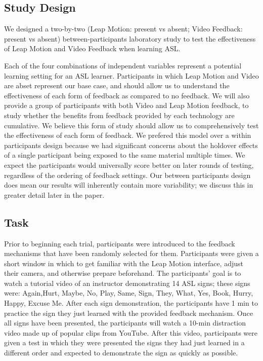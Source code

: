 \documentclass{sigchi}
\begin{document}
\subsection{Study Design}
We designed a two-by-two (Leap Motion: present vs absent; Video Feedback: present vs absent) between-participants laboratory study to test the effectiveness of Leap Motion and Video Feedback when learning ASL.  

Each of the four combinations of independent variables represent a potential learning setting for an ASL learner.  Participants in which Leap Motion and Video are abset represent our base case, and should allow us to understand the effectiveness of each form of feedback as compared to no feedback.  We will also provide a group of participants with both Video and Leap Motion feedback, to study whether the benefits from feedback provided by each technology are cumulative.  We believe this form of study should allow us to comprehensively test the effectiveness of each form of feedback.  We prefered this model over a within participants design because we had significant concerns about the holdover effects of a single participant being exposed to the same material multiple times.  We expect the participants would universally score better on later rounds of testing, regardless of the ordering of feedback settings.  Our between participants design does mean our results will inherently contain more variability; we discuss this in greater detail later in the paper.  



  
\subsection{Task}
Prior to beginning each trial, participants were introduced to the feedback mechanisms that have been randomly selected for them. Participants were given a short window in which to get familiar with the Leap Motion interface, adjust their camera, and otherwise prepare beforehand. The participants’ goal is to watch a tutorial video of an instructor demonstrating 14 ASL signs; these signs were: Again,Hurt,  Maybe, No, Play, Same, Sign, They, What, Yes, Book, Hurry, Happy, Excuse Me.  After each sign demonstration, the participants  have 1 min to practice the sign they just learned with the provided feedback mechanism. Once all signs have been presented, the participants will watch a 10-min distraction video made up of popular clips from YouTube.  After this video, participants were given a test in which they were presented the signs they had just learned in a different order and expected to demonstrate the sign as quickly as possible.  
\end{document}
